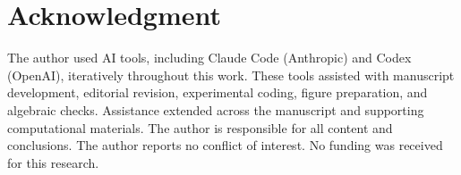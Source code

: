 \documentclass[conference]{IEEEtran}
\begin{document}
\vspace{-4pt}
\section*{Acknowledgment}
The author used AI tools, including Claude Code (Anthropic) and Codex (OpenAI), iteratively throughout this work. These tools assisted with manuscript development, editorial revision, experimental coding, figure preparation, and algebraic checks. Assistance extended across the manuscript and supporting computational materials. The author is responsible for all content and conclusions. The author reports no conflict of interest. No funding was received for this research.



\end{document}
